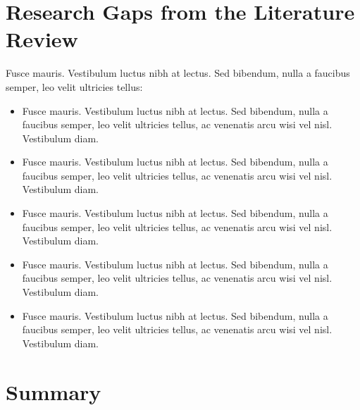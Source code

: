 \lipsum[1-3]



\section{Research Gaps from the Literature Review}
Fusce mauris. Vestibulum luctus nibh at lectus. Sed bibendum, nulla a faucibus semper, leo velit ultricies tellus:

\begin{itemize}

    \item Fusce mauris. Vestibulum luctus nibh at lectus. Sed bibendum, nulla a faucibus semper, leo velit ultricies tellus, ac venenatis arcu wisi vel nisl. Vestibulum diam.

    \item Fusce mauris. Vestibulum luctus nibh at lectus. Sed bibendum, nulla a faucibus semper, leo velit ultricies tellus, ac venenatis arcu wisi vel nisl. Vestibulum diam.
    
    \item Fusce mauris. Vestibulum luctus nibh at lectus. Sed bibendum, nulla a faucibus semper, leo velit ultricies tellus, ac venenatis arcu wisi vel nisl. Vestibulum diam.
    
    \item Fusce mauris. Vestibulum luctus nibh at lectus. Sed bibendum, nulla a faucibus semper, leo velit ultricies tellus, ac venenatis arcu wisi vel nisl. Vestibulum diam.
    
    \item Fusce mauris. Vestibulum luctus nibh at lectus. Sed bibendum, nulla a faucibus semper, leo velit ultricies tellus, ac venenatis arcu wisi vel nisl. Vestibulum diam.

\end{itemize}

\section{Summary}
\lipsum[1]